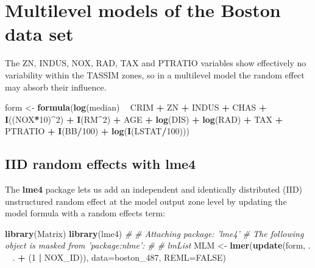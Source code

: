 \documentclass[]{book}
\newenvironment{Shaded}{\begin{snugshade}}{\end{snugshade}}
\newcommand{\CommentTok}[1]{\textcolor[rgb]{0.56,0.35,0.01}{\textit{#1}}}
\newcommand{\DataTypeTok}[1]{\textcolor[rgb]{0.13,0.29,0.53}{#1}}
\newcommand{\DecValTok}[1]{\textcolor[rgb]{0.00,0.00,0.81}{#1}}
\newcommand{\KeywordTok}[1]{\textcolor[rgb]{0.13,0.29,0.53}{\textbf{#1}}}
\newcommand{\NormalTok}[1]{#1}
\newcommand{\OperatorTok}[1]{\textcolor[rgb]{0.81,0.36,0.00}{\textbf{#1}}}
\newcommand{\OtherTok}[1]{\textcolor[rgb]{0.56,0.35,0.01}{#1}}
\newcommand{\StringTok}[1]{\textcolor[rgb]{0.31,0.60,0.02}{#1}}
\begin{document}
\hypertarget{multilevel-models-of-the-boston-data-set}{%
\section{Multilevel models of the Boston data set}\label{multilevel-models-of-the-boston-data-set}}

The ZN, INDUS, NOX, RAD, TAX and PTRATIO variables show effectively no variability within the TASSIM zones, so in a multilevel model the random effect may absorb their influence.

\begin{Shaded}
\begin{Highlighting}[]
\NormalTok{form <-}\StringTok{ }\KeywordTok{formula}\NormalTok{(}\KeywordTok{log}\NormalTok{(median) }\OperatorTok{~}\StringTok{ }\NormalTok{CRIM }\OperatorTok{+}\StringTok{ }\NormalTok{ZN }\OperatorTok{+}\StringTok{ }\NormalTok{INDUS }\OperatorTok{+}\StringTok{ }\NormalTok{CHAS }\OperatorTok{+}\StringTok{ }\KeywordTok{I}\NormalTok{((NOX}\OperatorTok{*}\DecValTok{10}\NormalTok{)}\OperatorTok{^}\DecValTok{2}\NormalTok{) }\OperatorTok{+}\StringTok{ }\KeywordTok{I}\NormalTok{(RM}\OperatorTok{^}\DecValTok{2}\NormalTok{) }\OperatorTok{+}\StringTok{ }
\StringTok{                  }\NormalTok{AGE }\OperatorTok{+}\StringTok{ }\KeywordTok{log}\NormalTok{(DIS) }\OperatorTok{+}\StringTok{ }\KeywordTok{log}\NormalTok{(RAD) }\OperatorTok{+}\StringTok{ }\NormalTok{TAX }\OperatorTok{+}\StringTok{ }\NormalTok{PTRATIO }\OperatorTok{+}\StringTok{ }\KeywordTok{I}\NormalTok{(BB}\OperatorTok{/}\DecValTok{100}\NormalTok{) }\OperatorTok{+}\StringTok{ }
\StringTok{                  }\KeywordTok{log}\NormalTok{(}\KeywordTok{I}\NormalTok{(LSTAT}\OperatorTok{/}\DecValTok{100}\NormalTok{)))}
\end{Highlighting}
\end{Shaded}

\hypertarget{iid-random-effects-with-lme4}{%
\subsection{IID random effects with lme4}\label{iid-random-effects-with-lme4}}

The \textbf{lme4} package \citep{R-lme4} lets us add an independent and identically distributed (IID) unstructured random effect at the model output zone level by updating the model formula with a random effects term:

\begin{Shaded}
\begin{Highlighting}[]
\KeywordTok{library}\NormalTok{(Matrix)}
\KeywordTok{library}\NormalTok{(lme4)}
\CommentTok{# }
\CommentTok{# Attaching package: 'lme4'}
\CommentTok{# The following object is masked from 'package:nlme':}
\CommentTok{# }
\CommentTok{#     lmList}
\NormalTok{MLM <-}\StringTok{ }\KeywordTok{lmer}\NormalTok{(}\KeywordTok{update}\NormalTok{(form, . }\OperatorTok{~}\StringTok{ }\NormalTok{. }\OperatorTok{+}\StringTok{ }\NormalTok{(}\DecValTok{1} \OperatorTok{|}\StringTok{ }\NormalTok{NOX_ID)), }\DataTypeTok{data=}\NormalTok{boston_}\DecValTok{487}\NormalTok{, }\DataTypeTok{REML=}\OtherTok{FALSE}\NormalTok{)}
\end{Highlighting}
\end{Shaded}
\end{document}
